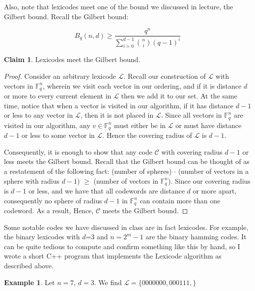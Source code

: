 \documentclass{article}
\numberwithin{theorem}{subsection}
\numberwithin{lemma}{subsection}
\theoremstyle{definition}
\newtheorem{exmp}{Example}
\numberwithin{exmp}{subsection}
\theoremstyle{definition}
\numberwithin{defn}{subsection}
\theoremstyle{definition}
\newtheorem{claim}{Claim}
\numberwithin{claim}{subsection}
\begin{document}
Also, note that lexicodes meet one of the bound we discussed in lecture, the Gilbert bound.  Recall the Gilbert bound:

\begin{equation}
B_q(n,d) \ge \frac{q^n}{\sum_{i=0}^{d-1} \binom{n}{i}(q-1)^{i}}
\end{equation}

\begin{claim}
Lexicodes meet the Gilbert bound.
\end{claim}

\begin{proof}
Consider an arbitrary lexicode $\mathcal{L}$.  Recall our construction of $\mathcal{L}$ with vectors in $\mathbb{F}_q^n$, wherein we visit each vector in our ordering,
and if it is distance $d$ or more to every current element in $\mathcal{L}$ then we add it to our set.  At the same time, notice that when a vector is visited in our algorithm, 
if it has distance $d-1$ or less to any vector in $\mathcal{L}$, then it is not placed in $\mathcal{L}$.  Since all vectors in $\mathbb{F}_q^n$ are visited in our algorithm, any
$v \in \mathbb{F}_q^n$ must either be in $\mathcal{L}$ or must have distance $d-1$ or less to some vector in $\mathcal{L}$.  Hence the covering radius of $\mathcal{L}$ is $d-1$.  

Consequently, it is enough to show that any code $\mathcal{C}$ with covering radius $d-1$ or less meets the Gilbert bound.  Recall that the Gilbert bound can be thought of as a restatement of the 
following fact: (number of spheres) $\cdot$ (number of vectors in a sphere with radius $d-1$) $\ge$ (number of vectors in $\mathbb{F}_q^n$).  Since our covering radius
is $d-1$ or less, and we have that all codewords are distance $d$ or more apart, consequently no sphere of radius $d-1$ in $\mathbb{F}_q^n$ can contain more than one codeword.
As a result, 
Hence, $\mathcal{C}$ meets the Gilbert bound.
\end{proof} 

Some notable codes we have discussed in class are in fact lexicodes. For example, the binary lexicodes with $d$=3 and $n=2^m-1$ are the binary hamming codes.  It can be quite
tedious to compute and confirm something like this by hand, so I wrote a short C++ program that implements the Lexicode algorithm as described above.  

\begin{exmp}
Let $n=7$, $d=3$.  We find $\mathcal{L}= \{0000000,000111,  \}$
\end{exmp}
\end{document}
